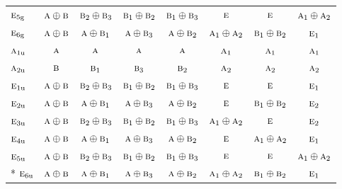 \documentclass[10pt,a4paper]{article}
\numberwithin{equation}{section}
\newcommand{\irr}[1]{\text{\normalfont\scshape #1}}
\newcommand{\ptag}[1]{\mathrm{#1}}
\begin{document}
{\begin{longtable}{@{}lccccccc@{}}
$\irr{e}_{5\ptag{g}}$ & $\irr{a}\oplus \irr{b}$ & $\irr{b}_{2}\oplus \irr{b}_{3}$ & $\irr{b}_{1}\oplus \irr{b}_{2}$ & $\irr{b}_{1}\oplus \irr{b}_{3}$ & $\irr{e}$ & $\irr{e}$ & $\irr{a}_{1}\oplus \irr{a}_{2}$\\
$\irr{e}_{6\ptag{g}}$ & $\irr{a}\oplus \irr{b}$ & $\irr{a}\oplus \irr{b}_{1}$ & $\irr{a}\oplus \irr{b}_{3}$ & $\irr{a}\oplus \irr{b}_{2}$ & $\irr{a}_{1}\oplus \irr{a}_{2}$ & $\irr{b}_{1}\oplus \irr{b}_{2}$ & $\irr{e}_{1}$\\
$\irr{a}_{1\ptag{u}}$ & $\irr{a}$ & $\irr{a}$ & $\irr{a}$ & $\irr{a}$ & $\irr{a}_{1}$ & $\irr{a}_{1}$ & $\irr{a}_{1}$\\
$\irr{a}_{2\ptag{u}}$ & $\irr{b}$ & $\irr{b}_{1}$ & $\irr{b}_{3}$ & $\irr{b}_{2}$ & $\irr{a}_{2}$ & $\irr{a}_{2}$ & $\irr{a}_{2}$\\
$\irr{e}_{1\ptag{u}}$ & $\irr{a}\oplus \irr{b}$ & $\irr{b}_{2}\oplus \irr{b}_{3}$ & $\irr{b}_{1}\oplus \irr{b}_{2}$ & $\irr{b}_{1}\oplus \irr{b}_{3}$ & $\irr{e}$ & $\irr{e}$ & $\irr{e}_{1}$\\
$\irr{e}_{2\ptag{u}}$ & $\irr{a}\oplus \irr{b}$ & $\irr{a}\oplus \irr{b}_{1}$ & $\irr{a}\oplus \irr{b}_{3}$ & $\irr{a}\oplus \irr{b}_{2}$ & $\irr{e}$ & $\irr{b}_{1}\oplus \irr{b}_{2}$ & $\irr{e}_{2}$\\
$\irr{e}_{3\ptag{u}}$ & $\irr{a}\oplus \irr{b}$ & $\irr{b}_{2}\oplus \irr{b}_{3}$ & $\irr{b}_{1}\oplus \irr{b}_{2}$ & $\irr{b}_{1}\oplus \irr{b}_{3}$ & $\irr{a}_{1}\oplus \irr{a}_{2}$ & $\irr{e}$ & $\irr{e}_{2}$\\
$\irr{e}_{4\ptag{u}}$ & $\irr{a}\oplus \irr{b}$ & $\irr{a}\oplus \irr{b}_{1}$ & $\irr{a}\oplus \irr{b}_{3}$ & $\irr{a}\oplus \irr{b}_{2}$ & $\irr{e}$ & $\irr{a}_{1}\oplus \irr{a}_{2}$ & $\irr{e}_{1}$\\
$\irr{e}_{5\ptag{u}}$ & $\irr{a}\oplus \irr{b}$ & $\irr{b}_{2}\oplus \irr{b}_{3}$ & $\irr{b}_{1}\oplus \irr{b}_{2}$ & $\irr{b}_{1}\oplus \irr{b}_{3}$ & $\irr{e}$ & $\irr{e}$ & $\irr{a}_{1}\oplus \irr{a}_{2}$\\*
$\irr{e}_{6\ptag{u}}$ & $\irr{a}\oplus \irr{b}$ & $\irr{a}\oplus \irr{b}_{1}$ & $\irr{a}\oplus \irr{b}_{3}$ & $\irr{a}\oplus \irr{b}_{2}$ & $\irr{a}_{1}\oplus \irr{a}_{2}$ & $\irr{b}_{1}\oplus \irr{b}_{2}$ & $\irr{e}_{1}$\\
\bottomrule\end{longtable}}
\end{document}
